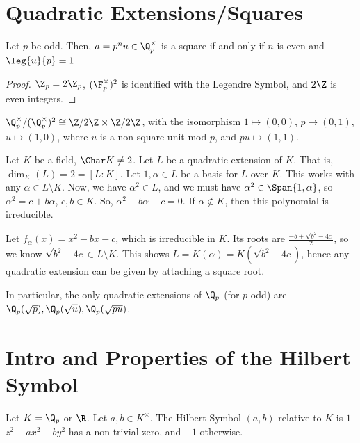 
\section{Quadratic Extensions/Squares}

\begin{thm}
    Let $p$ be odd. Then, $a=p^nu \in \Q_p^\times$ is a square if and only if $n$ is even and $\leg{u}{p}=1$
\end{thm}

\begin{proof}
    $\Z_p = 2\Z_p$, $(\F _p^\times)^2$ is identified with the Legendre Symbol, and $2\Z$ is even integers.
\end{proof}

\begin{cor}
    $\Q_p^\times / (\Q_p^\times)^2 \cong \Z/2\Z \times \Z/2\Z$, with the isomorphism $1 \mapsto (0,0)$, $p \mapsto (0,1)$, $u \mapsto (1,0)$, where $u$ is a non-square unit mod $p$, and $pu \mapsto (1,1).$
\end{cor}

Let $K$ be a field, $\Char K \neq 2$. Let $L$ be a quadratic extension of $K$. That is, $\dim _K(L) =2 =[L:K]$. Let $1, \alpha \in L$ be a basis for $L$ over $K$. This works with any $\alpha \in L \setminus K$. Now, we have $\alpha^2 \in L$, and we must have $\alpha^2 \in \Span \{1,\alpha\}$, so $\alpha^2=c + b\alpha$, $c,b \in K$. So, $\alpha^2 - b\alpha -c  =0$. If $\alpha \not \in K$, then this polynomial is irreducible.

Let $f_\alpha(x) = x^2-bx-c$, which is irreducible in $K$. Its roots are $\frac{-b \pm \sqrt{b^2-4c}}{2}$, so we know $\sqrt{b^2-4c}\in L\setminus K$. This shows $L = K(\alpha) = K(\sqrt{b^2-4c})$, hence any quadratic extension can be given by attaching a square root.

In particular, the only quadratic extensions of $\Q_p$ (for $p$ odd) are $\Q_p(\sqrt p),\Q_p(\sqrt u),\Q_p( \sqrt{pu})$.

\section{Intro and Properties of the Hilbert Symbol}

\begin{defn}
    Let $K = \Q_p$ or $\R$. Let $a,b \in K^\times$. The Hilbert Symbol $(a,b)$ relative to $K$ is $1$ $z^2-ax^2-by^2$ has a non-trivial zero, and $-1$ otherwise.
\end{defn}

